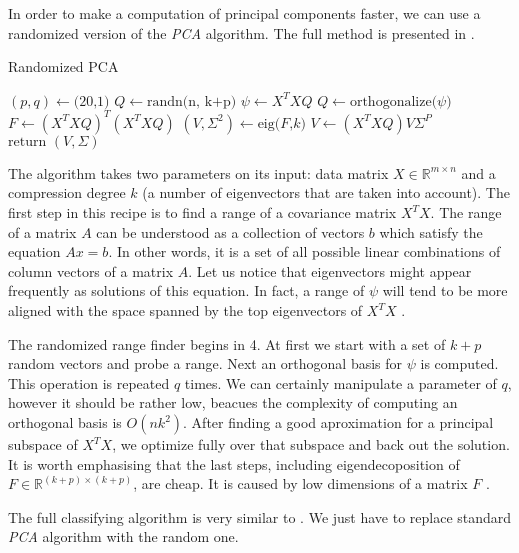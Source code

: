 In order to make a computation of principal components faster, we can use a randomized version of the \textit{PCA} algorithm. The full method is presented in . 

\begin{algorithm}
    \caption{Randomized PCA}\label{alg:rpca1}
    \begin{algorithmic}[1]
        \State $(p,q) \leftarrow \text{(20,1)}$
        \State $Q \leftarrow \text{randn(n, k+p)}$
            \State $\psi \leftarrow X^TXQ$
            \State $Q \leftarrow \text{orthogonalize($\psi$)}$
            \EndFor
            \State $F \leftarrow (X^TXQ)^T(X^TXQ)$
            \State $(V,\Sigma^2) \leftarrow \text{eig($F$,$k$)}$
            \State $V \leftarrow (X^TXQ)V\Sigma^P$
            \State $\text{return } (V, \Sigma)$
        \EndFunction
    \end{algorithmic}
\end{algorithm}

The algorithm takes two parameters on its input: data matrix $X \in \mathbb{R}^{m \times n}$ and a compression degree $k$ (a number of eigenvectors that are taken into account). The first step in this recipe is to find a range of a covariance matrix $X^TX$. The range of a matrix $A$ can be understood as a collection of vectors $b$ which satisfy the equation $Ax=b$. In other words, it is a set of all possible linear combinations of column vectors of a matrix $A$.  Let us notice that eigenvectors might appear frequently as solutions of this equation. In fact, a range of $\psi$ will tend to be more aligned with the space spanned by the top eigenvectors of $X^TX$ \cite{Mineiro}. 

The randomized range finder begins in 4. At first we start with a set of $k+p$ random vectors and probe a range. Next an orthogonal basis for $\psi$ is computed. This operation is repeated $q$ times. We can certainly manipulate a parameter of $q$, however it should be rather low, beacues the complexity of computing an orthogonal basis is $O(nk^2)$. 
After finding a good aproximation for a principal subspace of $X^TX$, we optimize fully over that subspace and back out the solution. It is worth emphasising that the last steps, including eigendecoposition of $F \in \mathbb{R}^{(k+p) \times (k+p)}$, are cheap. It is caused by low dimensions of a matrix $F$ \cite{Mineiro}.

The full classifying algorithm is very similar to . We just have to replace standard \textit{PCA} algorithm with the random one.

